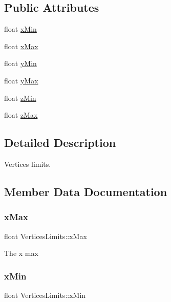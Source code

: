 \subsection*{Public Attributes}
\begin{DoxyCompactItemize}
\item 
float \hyperlink{struct_vertices_limits_a90e49fbb889a24549db2428d13bf10e0}{x\+Min}
\item 
float \hyperlink{struct_vertices_limits_ae4f8acb8ca6eba9f3b7bca248499188b}{x\+Max}
\item 
float \hyperlink{struct_vertices_limits_a5301a3b6bcbe63eeb66b1f12e6cd46d9}{y\+Min}
\item 
float \hyperlink{struct_vertices_limits_a7983184f6fce60048225d9efbc22d7ba}{y\+Max}
\item 
float \hyperlink{struct_vertices_limits_ad3367e8242446d5a7d1f9143ee82165b}{z\+Min}
\item 
float \hyperlink{struct_vertices_limits_a73636d9187c41906a82004c66d9a6e3f}{z\+Max}
\end{DoxyCompactItemize}


\subsection{Detailed Description}
Vertices limits. 

\subsection{Member Data Documentation}
\mbox{\label{struct_vertices_limits_ae4f8acb8ca6eba9f3b7bca248499188b}} 
\subsubsection{\texorpdfstring{x\+Max}{xMax}}
{\footnotesize\ttfamily float Vertices\+Limits\+::x\+Max}

The x max \mbox{\label{struct_vertices_limits_a90e49fbb889a24549db2428d13bf10e0}} 
\subsubsection{\texorpdfstring{x\+Min}{xMin}}
{\footnotesize\ttfamily float Vertices\+Limits\+::x\+Min}

